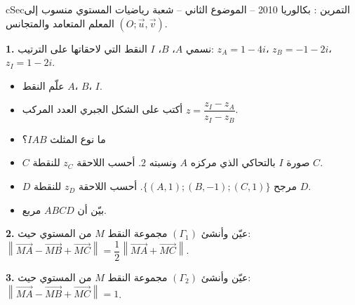 \documentclass[12pt,a4paper]{article}
\newenvironment{BOX}[2]{\begin{otherlanguage}{english}\begin{arbox}{#1}{#2}}{\end{arbox}\end{otherlanguage}}
\newcounter{exo}
\newenvironment{tamrin}[1]{\stepcounter{exo}\begin{BOX}{cSec}{التمرين \theexo: #1}}{\end{BOX}}
\newenvironment{sq}{\begin{itemize}[leftmargin=2.4em,itemsep=3pt]}{\end{itemize}}
\newcommand{\qa}{\item[(أ)]}\newcommand{\qb}{\item[(ب)]}\newcommand{\qc}{\item[(جـ)]}\newcommand{\qd}{\item[(د)]}\newcommand{\qe}{\item[(هـ)]}
\newcommand{\QQ}[1]{\par\smallskip\textbf{#1.} }
\begin{document}
\begin{tamrin}{بكالوريا 2010 -- الموضوع الثاني -- شعبة رياضيات}
المستوي منسوب إلى المعلم المتعامد والمتجانس $(O;\vec u,\vec v)$.
\QQ{1} نسمي $A$، $B$، $I$ النقط التي لاحقاتها على الترتيب: $z_A=1-4i$، $z_B=-1-2i$، $z_I=1-2i$.
\begin{sq}
\qa علّم النقط $A$، $B$، $I$.
\qb أكتب على الشكل الجبري العدد المركب $z=\dfrac{z_I-z_A}{z_I-z_B}$.
\qc ما نوع المثلث $IAB$؟
\qd $C$ صورة $I$ بالتحاكي الذي مركزه $A$ ونسبته $2$. أحسب اللاحقة $z_C$ للنقطة $C$.
\qe $D$ مرجح $\{(A,1);(B,-1);(C,1)\}$. أحسب اللاحقة $z_D$ للنقطة $D$.
\item[(و)] بيّن أن $ABCD$ مربع.
\end{sq}
\QQ{2} عيّن وأنشئ $(\Gamma_1)$ مجموعة النقط $M$ من المستوي حيث: $\left\|\overrightarrow{MA}-\overrightarrow{MB}+\overrightarrow{MC}\right\|=\dfrac12\left\|\overrightarrow{MA}+\overrightarrow{MC}\right\|$.
\QQ{3} عيّن وأنشئ $(\Gamma_2)$ مجموعة النقط $M$ من المستوي حيث: $\left\|\overrightarrow{MA}-\overrightarrow{MB}+\overrightarrow{MC}\right\|=1$.
\end{tamrin}
\end{document}
